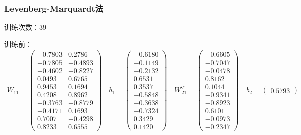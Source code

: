 \documentclass[UTF8]{article}
\begin{document}
\subsubsection{Levenberg-Marquardt法}
训练次数：39

训练前：
\begin{equation}
\nonumber
\begin{aligned}
    W_{11} = 
    \left(
    \begin{matrix}
        -0.7803 & 0.2786\\
   -0.7805 & -0.4893\\
   -0.4602 & -0.8227\\
    0.0493 &  0.6765\\
    0.9453 &  0.1694\\
    0.4208  & 0.8962\\
   -0.3763 & -0.8779\\
   -0.4171 &  0.1693\\
    0.7007 & -0.4298\\
    0.8233 &  0.6555
    \end{matrix}
    \right)
    \quad
    b_{1} = 
    \left(
    \begin{matrix}
        -0.6180\\
        -0.1149\\
        -0.2132\\
         0.6531\\
         0.3537\\
        -0.5848\\
        -0.3638\\
        -0.7324\\
         0.3429\\
         0.1420
    \end{matrix}
    \right)
    \quad
    W_{21}^T = 
    \left(
    \begin{matrix}
        -0.6605\\-0.7047\\ -0.0478 \\  0.8162\\ 0.1044 \\ -0.9341 \\-0.8923 \\  0.6101 \\ -0.0973\\-0.2347
    \end{matrix}
    \right)
    \quad
    b_{2} = 
    \left(
    \begin{matrix}
        0.5793
    \end{matrix}
    \right)
\end{aligned}
\end{equation}
\end{document}
